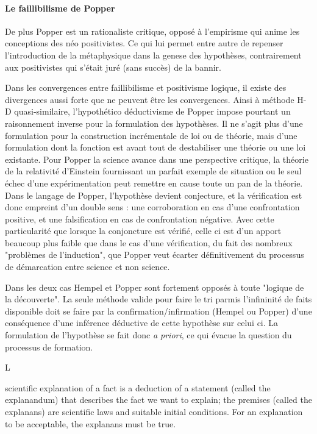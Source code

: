 {\paragraph{Le faillibilisme de Popper}

De plus Popper est un rationaliste critique, opposé à l'empirisme qui anime les conceptions des néo positivistes. Ce qui lui permet entre autre de repenser l'introduction de la métaphysique dans la genese des hypothèses, contrairement aux positivistes qui s'était juré (sans succès) de la bannir.

Dans les convergences entre faillibilisme et positivisme logique, il existe des divergences aussi forte que ne peuvent être les convergences. Ainsi à méthode H-D quasi-similaire, l'hypothético déductivisme de Popper impose pourtant un raisonnement inverse pour la formulation des hypothèses. Il ne s'agit plus d'une formulation pour la construction incrémentale de loi ou de théorie, mais d'une formulation dont la fonction est avant tout de destabiliser une théorie ou une loi existante. Pour Popper la science avance dans une perspective critique, la théorie de la relativité d'Einstein fournissant un parfait exemple de situation ou le seul échec d'une expérimentation peut remettre en cause toute un pan de la théorie. Dans le langage de Popper, l'hypothèse devient conjecture, et la vérification est donc empreint d'un double sens : une corroboration en cas d'une confrontation positive, et une falsification en cas de confrontation négative. Avec cette particularité que lorsque la conjoncture est vérifié, celle ci est d'un apport beaucoup plus faible que dans le cas d'une vérification, du fait des nombreux "problèmes de l'induction", que Popper veut écarter définitivement du processus de démarcation entre science et non science. 


Dans les deux cas Hempel et Popper sont fortement opposés à toute "logique de la découverte". La seule méthode valide pour faire le tri parmis l'infininité de faits disponible doit se faire par la confirmation/infirmation (Hempel ou Popper) d'une conséquence d'une inférence déductive de cette hypothèse sur celui ci. La formulation de l'hypothèse se fait donc \textit{a priori}, ce qui évacue la question du processus de formation.

L

 scientific explanation of a fact is a deduction of a statement (called the explanandum) that describes the fact we want to explain; the premises (called the explanans) are scientific laws and suitable initial conditions. For an explanation to be acceptable, the explanans must be true. 

}
